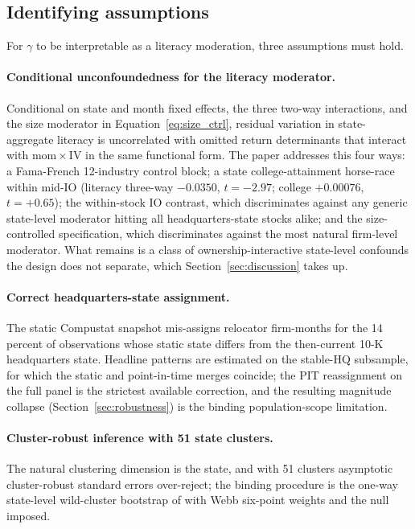 \subsection{Identifying assumptions}

For $\gamma$ to be interpretable as a literacy moderation, three assumptions must hold.

\paragraph{Conditional unconfoundedness for the literacy moderator.} Conditional on state and month fixed effects, the three two-way interactions, and the size moderator in Equation~\eqref{eq:size_ctrl}, residual variation in state-aggregate literacy is uncorrelated with omitted return determinants that interact with $\mathrm{mom}\times\mathrm{IV}$ in the same functional form. The paper addresses this four ways: a Fama-French 12-industry control block; a state college-attainment horse-race within mid-IO (literacy three-way $-0.0350$, $t = -2.97$; college $+0.00076$, $t = +0.65$); the within-stock IO contrast, which discriminates against any generic state-level moderator hitting all headquarters-state stocks alike; and the size-controlled specification, which discriminates against the most natural firm-level moderator. What remains is a class of ownership-interactive state-level confounds the design does not separate, which Section~\ref{sec:discussion} takes up.

\paragraph{Correct headquarters-state assignment.} The static Compustat snapshot mis-assigns relocator firm-months for the 14 percent of observations whose static state differs from the then-current 10-K headquarters state. Headline patterns are estimated on the stable-HQ subsample, for which the static and point-in-time merges coincide; the PIT reassignment on the full panel is the strictest available correction, and the resulting magnitude collapse (Section~\ref{sec:robustness}) is the binding population-scope limitation.

\paragraph{Cluster-robust inference with 51 state clusters.} The natural clustering dimension is the state, and with 51 clusters asymptotic cluster-robust standard errors over-reject; the binding procedure is the one-way state-level wild-cluster bootstrap of \citet{cameronGelbachMiller2008} with Webb six-point weights \citep{webb2014} and the null imposed.

